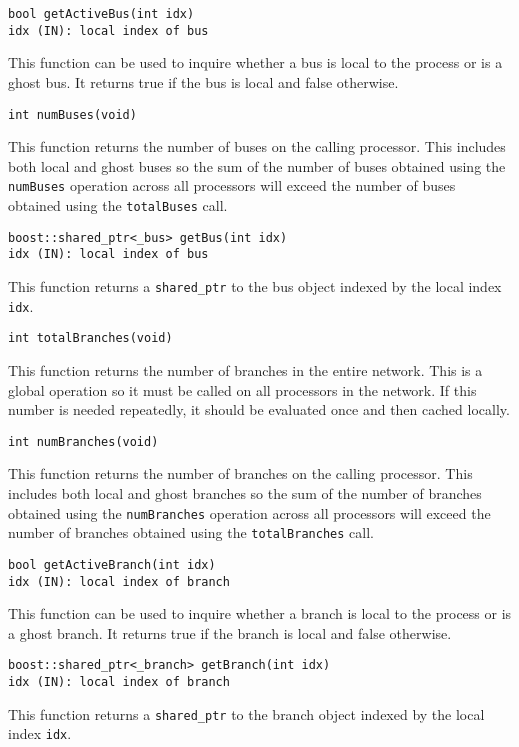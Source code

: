 \documentclass[12pt]{article}
\begin{document}
\color{blue}
\begin{verbatim}
bool getActiveBus(int idx)
idx (IN): local index of bus
\end{verbatim}
\normalcolor
This function can be used to inquire whether a bus is local to the process or is a
ghost bus. It returns true if the bus is local and false otherwise.

\color{blue}
\begin{verbatim}
int numBuses(void)
\end{verbatim}
\normalcolor
This function returns the number of buses on the calling processor. This
includes both local and ghost buses so the sum of the number of buses obtained
using the \texttt{numBuses} operation across all processors will exceed the
number of buses obtained using the \texttt{totalBuses} call.


\color{blue}
\begin{verbatim}
boost::shared_ptr<_bus> getBus(int idx)
idx (IN): local index of bus
\end{verbatim}
\normalcolor
This function returns a \texttt{shared\_ptr} to the bus object indexed by the
local index \texttt{idx}.

\color{blue}
\begin{verbatim}
int totalBranches(void)
\end{verbatim}
\normalcolor
This function returns the number of branches in the entire network. This is a
global operation so it must be called on all processors in the network. If this
number is needed repeatedly, it should be evaluated once and then cached
locally.

\color{blue}
\begin{verbatim}
int numBranches(void)
\end{verbatim}
\normalcolor
This function returns the number of branches on the calling processor. This
includes both local and ghost branches so the sum of the number of branches obtained
using the \texttt{numBranches} operation across all processors will exceed the
number of branches obtained using the \texttt{totalBranches} call.

\color{blue}
\begin{verbatim}
bool getActiveBranch(int idx)
idx (IN): local index of branch
\end{verbatim}
\normalcolor
This function can be used to inquire whether a branch is local to the process or is a
ghost branch. It returns true if the branch is local and false otherwise.

\color{blue}
\begin{verbatim}
boost::shared_ptr<_branch> getBranch(int idx)
idx (IN): local index of branch
\end{verbatim}
\normalcolor
This function returns a \texttt{shared\_ptr} to the branch object indexed by the
local index \texttt{idx}.
\end{document}
